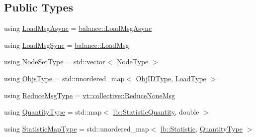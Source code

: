 \subsection*{Public Types}
\begin{DoxyCompactItemize}
\item 
using \hyperlink{structvt_1_1vrt_1_1collection_1_1lb_1_1_tempered_l_b_a38d9ad7e92612cdbdf564b6f49b516a7}{Load\+Msg\+Async} = \hyperlink{structvt_1_1vrt_1_1collection_1_1balance_1_1_load_msg_async}{balance\+::\+Load\+Msg\+Async}
\item 
using \hyperlink{structvt_1_1vrt_1_1collection_1_1lb_1_1_tempered_l_b_aa46eb8cbc4c505f35b970f75e38b5e0d}{Load\+Msg\+Sync} = \hyperlink{structvt_1_1vrt_1_1collection_1_1balance_1_1_load_msg}{balance\+::\+Load\+Msg}
\item 
using \hyperlink{structvt_1_1vrt_1_1collection_1_1lb_1_1_tempered_l_b_aa18a0edaf10119e307e7209371caa673}{Node\+Set\+Type} = std\+::vector$<$ \hyperlink{namespacevt_a866da9d0efc19c0a1ce79e9e492f47e2}{Node\+Type} $>$
\item 
using \hyperlink{structvt_1_1vrt_1_1collection_1_1lb_1_1_tempered_l_b_ad54faf59319f1b33dec689ee853d688e}{Objs\+Type} = std\+::unordered\+\_\+map$<$ \hyperlink{structvt_1_1vrt_1_1collection_1_1lb_1_1_base_l_b_a790b22acf448880599724749cdc4e9b3}{Obj\+I\+D\+Type}, \hyperlink{namespacevt_a8fb51741340b87d7aaee0bef60e9896b}{Load\+Type} $>$
\item 
using \hyperlink{structvt_1_1vrt_1_1collection_1_1lb_1_1_tempered_l_b_a3e688a286b16334d43666bae581231b7}{Reduce\+Msg\+Type} = \hyperlink{namespacevt_1_1collective_aa439a90f05078f2bcf918641c951946f}{vt\+::collective\+::\+Reduce\+None\+Msg}
\item 
using \hyperlink{structvt_1_1vrt_1_1collection_1_1lb_1_1_tempered_l_b_aea04b60ba909fbd4ec49d1d9f9fb632c}{Quantity\+Type} = std\+::map$<$ \hyperlink{namespacevt_1_1vrt_1_1collection_1_1lb_a74989c7b4dd16fcc067e90a29cd1febe}{lb\+::\+Statistic\+Quantity}, double $>$
\item 
using \hyperlink{structvt_1_1vrt_1_1collection_1_1lb_1_1_tempered_l_b_ad9f4a2ede0929ca64fc6108cc812db33}{Statistic\+Map\+Type} = std\+::unordered\+\_\+map$<$ \hyperlink{namespacevt_1_1vrt_1_1collection_1_1lb_af0e20ef9afee77295053aa83bf1348b1}{lb\+::\+Statistic}, \hyperlink{structvt_1_1vrt_1_1collection_1_1lb_1_1_base_l_b_a864b2c437d81680577013741e265ef0d}{Quantity\+Type} $>$
\end{DoxyCompactItemize}
